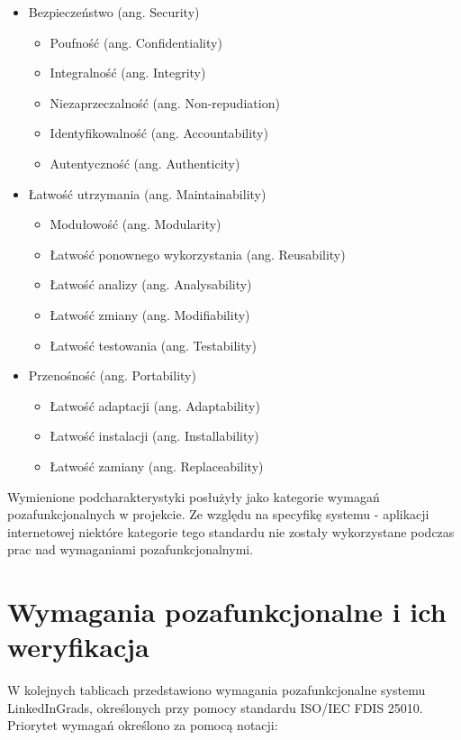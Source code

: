 \begin{itemize}
\begin{itemize}
	\end{itemize}
\item Bezpieczeństwo (ang. Security)
	\begin{itemize}
	\item Poufność (ang. Confidentiality)
	\item Integralność (ang. Integrity)
	\item Niezaprzeczalność (ang. Non-repudiation)
	\item Identyfikowalność (ang. Accountability)
	\item Autentyczność (ang. Authenticity)
	\end{itemize}
\item Łatwość utrzymania (ang. Maintainability)
	\begin{itemize}
	\item Modułowość (ang. Modularity)
	\item Łatwość ponownego wykorzystania (ang. Reusability)
	\item Łatwość analizy (ang. Analysability)
	\item Łatwość zmiany (ang. Modifiability)
	\item Łatwość testowania (ang. Testability)
	\end{itemize}
\item Przenośność (ang. Portability)
	\begin{itemize}
	\item Łatwość adaptacji (ang. Adaptability)
	\item Łatwość instalacji (ang. Installability)
	\item Łatwość zamiany (ang. Replaceability)
	\end{itemize}
\end{itemize}

Wymienione podcharakterystyki posłużyły jako kategorie wymagań pozafunkcjonalnych w projekcie. Ze względu na specyfikę systemu - aplikacji internetowej niektóre kategorie tego standardu nie zostały wykorzystane podczas prac nad wymaganiami pozafunkcjonalnymi.

\section{Wymagania pozafunkcjonalne i ich weryfikacja}

W kolejnych tablicach przedstawiono wymagania pozafunkcjonalne systemu LinkedInGrads, określonych przy pomocy standardu ISO/IEC FDIS 25010. Priorytet wymagań określono za pomocą notacji:

